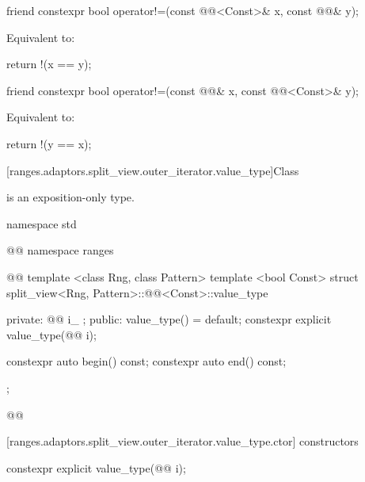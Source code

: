 %
\begin{itemdecl}
friend constexpr bool operator!=(const @@<Const>& x, const @@& y);
\end{itemdecl}

\begin{itemdescr}
\pnum
\effects Equivalent to:
\begin{codeblock}
return !(x == y);
\end{codeblock}
\end{itemdescr}

%
\begin{itemdecl}
friend constexpr bool operator!=(const @@& x, const @@<Const>& y);
\end{itemdecl}

\begin{itemdescr}
\pnum
\effects Equivalent to:
\begin{codeblock}
return !(y == x);
\end{codeblock}
\end{itemdescr}

[ranges.adaptors.split_view.outer_iterator.value_type]{Class }

\pnum
\enternote {} is an exposition-only type.\exitnote

\begin{codeblock}
namespace std { @@ namespace ranges { @@
  template <class Rng, class Pattern>
  template <bool Const>
  struct split_view<Rng, Pattern>::@@<Const>::value_type {
  private:
    @@ i_ {};
  public:
    value_type() = default;
    constexpr explicit value_type(@@ i);

    constexpr auto begin() const;
    constexpr auto end() const;
  };
}}@\removed{\}\}}@
\end{codeblock}

[ranges.adaptors.split_view.outer_iterator.value_type.ctor]{ constructors}

%
\begin{itemdecl}
constexpr explicit value_type(@@ i);
\end{itemdecl}


